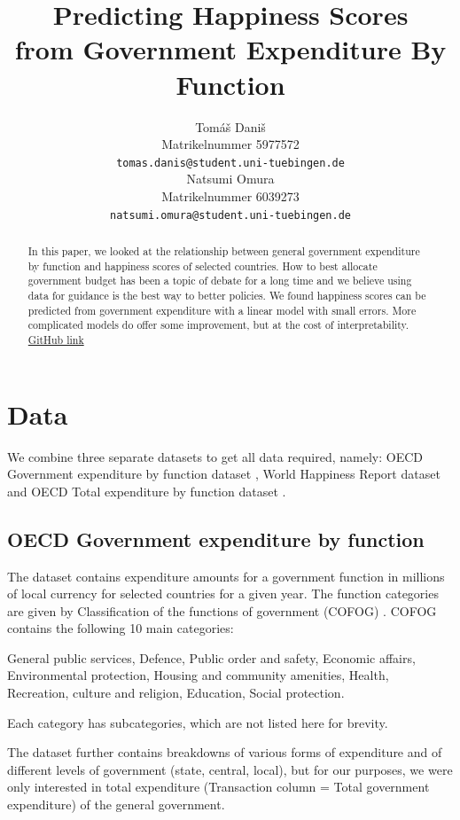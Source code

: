 \documentclass{article}
\title{Predicting Happiness Scores\\ from Government Expenditure By Function}
\author{%
  Tomáš Daniš\\
  Matrikelnummer 5977572\\
  \texttt{tomas.danis@student.uni-tuebingen.de} \\
  \And
  Natsumi Omura\\
  Matrikelnummer 6039273\\
  \texttt{natsumi.omura@student.uni-tuebingen.de} \\
}
\begin{document}
\maketitle

\begin{abstract}
  In this paper, we looked at the relationship between general government expenditure
  by function and happiness scores of selected countries. How to best allocate government budget
  has been a topic of debate for a long time and we believe using data for guidance is the best way
  to better policies. We found happiness scores can be predicted from government expenditure 
  with a linear model with small errors. More complicated models do offer some improvement,
  but at the cost  of interpretability. \href{https://github.com/AgiNetz/data_literacy_project}{GitHub link}
\end{abstract}

\section{Data}
We combine three separate datasets to get all data required, namely: OECD Government expenditure by function dataset \cite{cofogdata}, World Happiness Report dataset \cite{whrdata} and OECD Total expenditure by function dataset \cite{totalspending}.


\subsection{OECD Government expenditure by function}
\label{oecd_data}
The dataset contains expenditure amounts for a government function in millions of local currency for selected countries for a given year. The function categories are given by Classification of the functions of government (COFOG) \cite{cofogcats}. COFOG contains the following 10 main categories: 

General public services, Defence, Public order and safety, Economic affairs, Environmental protection, Housing and community amenities, Health, Recreation, culture and religion,  Education, Social protection. 

Each category has subcategories, which are not listed here for brevity.

The dataset further contains breakdowns of various forms of expenditure and of different levels of government (state, central, local), but for our purposes, we were only interested in total expenditure (Transaction column = Total government expenditure) of the general government.
\end{document}
